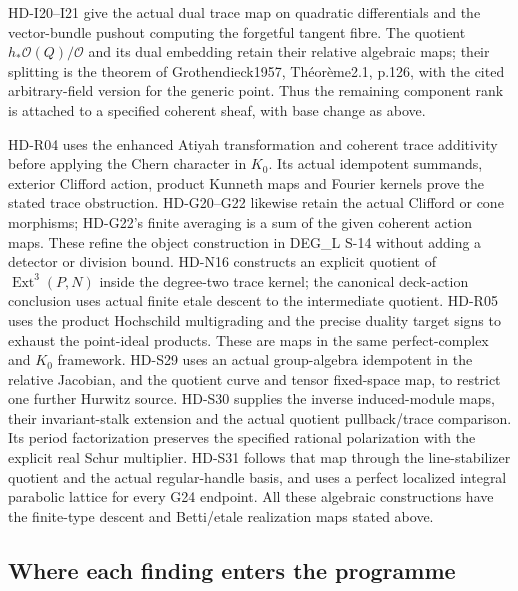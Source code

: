 HD-I20--I21 give the actual dual trace map on quadratic differentials
and the vector-bundle pushout computing the forgetful tangent fibre.
The quotient $h_*\mathcal O(Q)/\mathcal O$ and its dual embedding
retain their relative algebraic maps; their splitting is the theorem of
Grothendieck1957, Th\'eor\`eme2.1, p.126, with the cited arbitrary-field
version for the generic point. Thus the remaining component rank is
attached to a specified coherent sheaf, with base change as above.

HD-R04 uses the enhanced Atiyah transformation and coherent trace
additivity before applying the Chern character in $K_0$. Its actual
idempotent summands, exterior Clifford action, product Kunneth maps and
Fourier kernels prove the stated trace obstruction. HD-G20--G22 likewise
retain the actual Clifford or cone morphisms; HD-G22's finite averaging
is a sum of the given coherent action maps. These refine the object
construction in DEG\_L S-14 without adding a detector or division bound.
HD-N16 constructs an explicit quotient of $\operatorname{Ext}^3(P,N)$
inside the degree-two trace kernel; the canonical deck-action conclusion
uses actual finite etale descent to the intermediate quotient. HD-R05
uses the product Hochschild multigrading and the precise duality target
signs to exhaust the point-ideal products. These are maps in the same
perfect-complex and $K_0$ framework. HD-S29 uses an actual group-algebra idempotent in the relative Jacobian,
and the quotient curve and tensor fixed-space map, to restrict one further
Hurwitz source. HD-S30 supplies the inverse induced-module maps, their invariant-stalk
extension and the actual quotient pullback/trace comparison. Its period
factorization preserves the specified rational polarization with the
explicit real Schur multiplier. HD-S31 follows that map through the
line-stabilizer quotient and the actual regular-handle basis, and uses
a perfect localized integral parabolic lattice for every G24 endpoint.
All these algebraic constructions have the finite-type
descent and Betti/etale realization maps stated above.

\subsection{Where each finding enters the programme}

